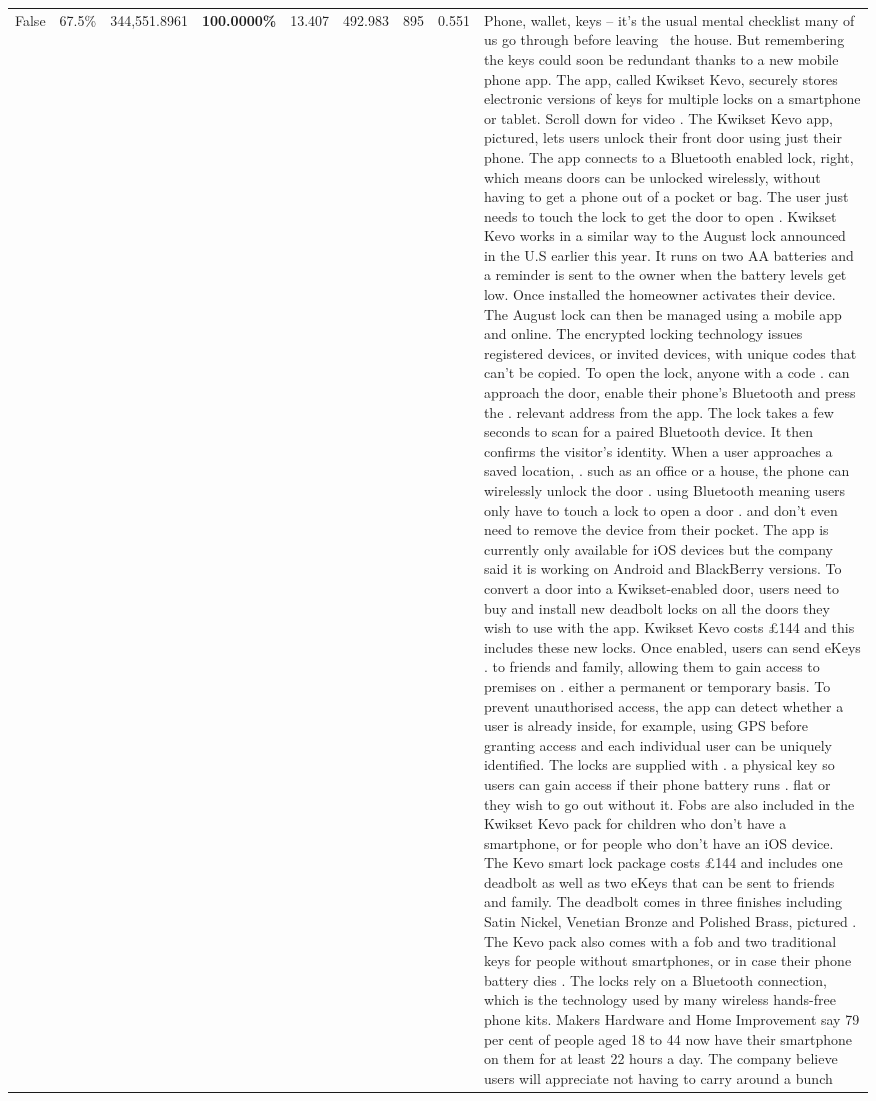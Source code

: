 \begin{table}[H]
\begin{tabular}{lllrlllll}
False & 67.5\% & 344,551.8961 & \bfseries \color{red} 100.0000\% & 13.407 & 492.983 & 895 & 0.551 & Phone, wallet, keys – it’s the usual mental checklist many of us go through before leaving  the house. But remembering the keys could soon be redundant thanks to a new mobile phone app. The app, called Kwikset Kevo, securely stores electronic versions of keys for multiple locks on a smartphone or tablet. Scroll down for video . The Kwikset Kevo app, pictured, lets users unlock their front door using just their phone. The app connects to a Bluetooth enabled lock, right, which means doors can be unlocked wirelessly, without having to get a phone out of a pocket or bag. The user just needs to touch the lock to get the door to open . Kwikset Kevo works in a similar way to the August lock announced in the U.S earlier this year. It runs on two AA batteries and a reminder is sent to the owner when the battery levels get low. Once installed the homeowner activates their device. The August lock can then be managed using a mobile app and online. The encrypted locking technology issues registered devices, or invited devices, with unique codes that can't be copied. To open the lock, anyone with a code . can approach the door, enable their phone's Bluetooth and press the . relevant address from the app. The lock takes a few seconds to scan for a paired Bluetooth device. It then confirms the visitor's identity. When a user approaches a saved location, . such as an office or a house, the phone can wirelessly unlock the door . using Bluetooth meaning users only have to touch a lock to open a door . and don't even need to remove the device from their pocket. The app is currently only available for iOS devices but the company said it is working on Android and BlackBerry versions. To convert a door into a Kwikset-enabled door, users need to buy and install new deadbolt locks on all the doors they wish to use with the app. Kwikset Kevo costs £144 and this includes these new locks. Once enabled, users can send eKeys . to friends and family, allowing them to gain access to premises on . either a permanent or temporary basis. To prevent unauthorised access, the app can detect whether a user is already inside, for example, using GPS before granting access and each individual user can be uniquely identified. The locks are supplied with . a physical key so users can gain access if their phone battery runs . flat or they wish to go out without it. Fobs are also included in the Kwikset Kevo pack for children who don't have a smartphone, or for people who don't have an iOS device. The Kevo smart lock package costs £144 and includes one deadbolt as well as two eKeys that can be sent to friends and family. The deadbolt comes in three finishes including Satin Nickel, Venetian Bronze and Polished Brass, pictured . The Kevo pack also comes with a fob and two traditional keys for people without smartphones, or in case their phone battery dies . The locks rely on a Bluetooth connection, which is the technology used by many wireless hands-free phone kits. Makers Hardware and Home Improvement say 79 per cent of people aged 18 to 44 now have their smartphone on them for at least 22 hours a day. The company believe users will appreciate not having to carry around a bunch 
\end{tabular}
\end{table}
